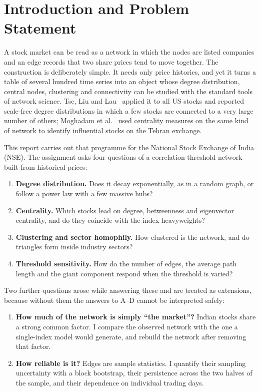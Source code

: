 \documentclass[11pt,a4paper]{article}
\begin{document}
\section{Introduction and Problem Statement}

A stock market can be read as a network in which the nodes are listed companies and an edge records that two share
prices tend to move together. The construction is deliberately simple. It needs only price histories, and yet it turns a
table of several hundred time series into an object whose degree distribution, central nodes, clustering and
connectivity can be studied with the standard tools of network science. Tse, Liu and Lau~\cite{tse2010} applied it to
all US stocks and reported scale-free degree distributions in which a few stocks are connected to a very large number
of others; Moghadam et al.~\cite{moghadam2019} used centrality measures on the same kind of network to identify
influential stocks on the Tehran exchange.

This report carries out that programme for the National Stock Exchange of India (NSE). The assignment asks four
questions of a correlation-threshold network built from historical prices:

\begin{enumerate}[label=\textbf{\Alph*.}]
\item \textbf{Degree distribution.} Does it decay exponentially, as in a random graph, or follow a power law with a few
      massive hubs?
\item \textbf{Centrality.} Which stocks lead on degree, betweenness and eigenvector centrality, and do they coincide
      with the index heavyweights?
\item \textbf{Clustering and sector homophily.} How clustered is the network, and do triangles form inside industry
      sectors?
\item \textbf{Threshold sensitivity.} How do the number of edges, the average path length and the giant component
      respond when the threshold is varied?
\end{enumerate}

Two further questions arose while answering these and are treated as extensions, because without them the answers
to A--D cannot be interpreted safely:

\begin{enumerate}[label=\textbf{E\arabic*.}]
\item \textbf{How much of the network is simply ``the market''?} Indian stocks share a strong common factor. I compare
      the observed network with the one a single-index model would generate, and rebuild the network after removing
      that factor.
\item \textbf{How reliable is it?} Edges are sample statistics. I quantify their sampling uncertainty with a block
      bootstrap, their persistence across the two halves of the sample, and their dependence on individual trading days.
\end{enumerate}
\end{document}
